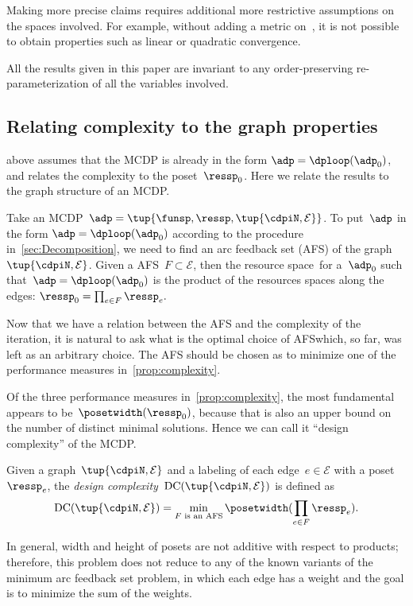 \begin{remark}
    Making more precise claims requires additional more restrictive assumptions on the spaces involved.
    For example, without adding a metric on~\ressp, it is not possible to obtain properties such as linear or quadratic convergence.
\end{remark}

\begin{remark}
    All the results given in this paper are invariant to any order-preserving re-parameterization of all the variables involved.
\end{remark}

\subsection{Relating complexity to the graph properties}

 above assumes that the MCDP is already in the form $\adp=\dploop(\adp_{0})$, and relates the complexity to the poset~$\ressp_{0}$.
Here we relate the results to the graph structure of an MCDP.

Take an MCDP~$\adp=\tup{ \funsp,\ressp,\tup{ \cdpiN,\mathcal{E}} } $.
To put~$\adp$ in the form $\adp=\dploop(\adp_{0})$ according to the procedure in~\cref{sec:Decomposition}, we need to find an arc feedback set (AFS) of the graph~$\tup{ \cdpiN,\mathcal{E}} $.
Given a AFS~$F\subset\mathcal{E}$, then the resource space~\ressp for a~$\adp_{0}$ such that~$\adp=\dploop(\adp_{0})$ is the product of the resources spaces along the edges: $\ressp_{0}=\prod_{e\in F}\ressp_{e}.$

Now that we have a relation between the AFS and the complexity of the iteration, it is natural to ask what is the optimal choice of AFS\textemdash which, so far, was left as an arbitrary choice.
The AFS should be chosen as to minimize one of the performance measures in~\cref{prop:complexity}.

Of the three performance measures in~\cref{prop:complexity}, the most fundamental appears to be~$\posetwidth(\ressp_{0})$, because that is also an upper bound on the number of distinct minimal solutions.
Hence we can call it ``design complexity'' of the MCDP.
\begin{definition}
    \label{def:design-complexity}Given a graph~$\tup{ \cdpiN,\mathcal{E}} $
    and a labeling of each edge~$e\in\mathcal{E}$ with a poset~$\ressp_{e}$,
    the \emph{design complexity~}$\text{DC}(\tup{ \cdpiN,\mathcal{E}} )$
    is defined as
    \begin{equation}
        \text{DC}(\tup{ \cdpiN,\mathcal{E}} )=\min_{F\text{ is an AFS}}\posetwidth(\prod_{e\in F}\ressp_{e}).\label{eq:complexity}
    \end{equation}
\end{definition}
In general, width and height of posets are not additive with respect to products; therefore, this problem does not reduce to any of the known variants of the minimum arc feedback set problem, in which each edge has a weight and the goal is to minimize the sum of the weights.

